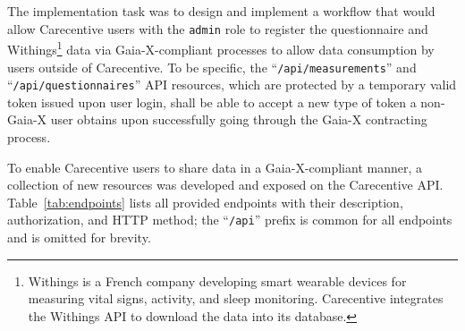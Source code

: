 The implementation task was to design and implement a workflow that would allow Carecentive users with the \texttt{admin} role to register the questionnaire and Withings\footnote{Withings is a French company developing smart wearable devices for measuring vital signs, activity, and sleep monitoring. Carecentive integrates the Withings API to download the data into its database.} data via Gaia-X-compliant processes to allow data consumption by users outside of Carecentive.
To be specific, the ``\texttt{/api/measurements}'' and ``\texttt{/api/questionnaires}'' API resources, which are protected by a temporary valid token issued upon user login, shall be able to accept a new type of token a non-Gaia-X user obtains upon successfully going through the Gaia-X contracting process.

To enable Carecentive users to share data in a Gaia-X-compliant manner, a collection of new resources was developed and exposed on the Carecentive API. Table~\ref{tab:endpoints} lists all provided endpoints with their description, authorization, and HTTP method; the ``\texttt{/api}'' prefix is common for all endpoints and is omitted for brevity.

